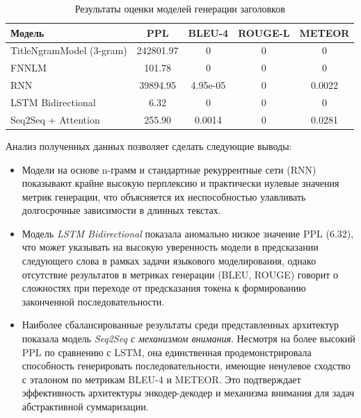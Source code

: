 \documentclass[coursework]{SCWorks}
\begin{document}
    \begin{table}[h!]
        \centering
        \caption{Результаты оценки моделей генерации заголовков}
        \label{tab:metrics_results}
        \begin{tabular}{|l|c|c|c|c|}
            \hline
            \textbf{Модель}          & \textbf{PPL} & \textbf{BLEU-4} & \textbf{ROUGE-L} & \textbf{METEOR} \\ \hline
            TitleNgramModel (3-gram) & 242801.97    & 0               & 0                & 0               \\ \hline
            FNNLM                    & 101.78       & 0               & 0                & 0               \\ \hline
            RNN                      & 39894.95     & 4.95e-05        & 0                & 0.0022          \\ \hline
            LSTM Bidirectional       & 6.32         & 0               & 0                & 0               \\ \hline
            Seq2Seq + Attention      & 255.90       & 0.0014          & 0                & 0.0281          \\ \hline
        \end{tabular}
    \end{table}

    Анализ полученных данных позволяет сделать следующие выводы:
    \begin{itemize}
        \item Модели на основе n-грамм и стандартные рекуррентные сети (RNN) показывают крайне высокую перплексию и практически нулевые значения метрик генерации, что объясняется их неспособностью улавливать долгосрочные зависимости в длинных текстах.
        \item Модель \textit{LSTM Bidirectional} показала аномально низкое значение PPL (6.32), что может указывать на высокую уверенность модели в предсказании следующего слова в рамках задачи языкового моделирования, однако отсутствие результатов в метриках генерации (BLEU, ROUGE) говорит о сложностях при переходе от предсказания токена к формированию законченной последовательности.
        \item Наиболее сбалансированные результаты среди представленных архитектур показала модель \textit{Seq2Seq с механизмом внимания}. Несмотря на более высокий PPL по сравнению с LSTM, она единственная продемонстрировала способность генерировать последовательности, имеющие ненулевое сходство с эталоном по метрикам BLEU-4 и METEOR. Это подтверждает эффективность архитектуры энкодер-декодер и механизма внимания для задач абстрактивной суммаризации.
    \end{itemize}
\end{document}
